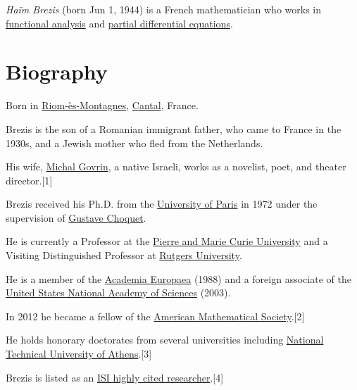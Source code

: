 \documentclass{book}
\numberwithin{equation}{section}
\begin{document}
\textit{Haïm Brezis} (born Jun 1, 1944) is a French mathematician who works in \href{https://en.wikipedia.org/wiki/Functional_analysis}{functional analysis} and \href{https://en.wikipedia.org/wiki/Partial_differential_equation}{partial differential equations}.

\section{Biography}
Born in \href{https://en.wikipedia.org/wiki/Riom-%C3%A8s-Montagnes}{Riom-ès-Montagnes}, \href{https://en.wikipedia.org/wiki/Cantal}{Cantal}, France.
    
Brezis is the son of a Romanian immigrant father, who came to France in the 1930s, and a Jewish mother who fled from the Netherlands.

His wife, \href{https://en.wikipedia.org/wiki/Michal_Govrin}{Michal Govrin}, a native Israeli, works as a novelist, poet, and theater director.[1]

Brezis received his Ph.D. from the \href{https://en.wikipedia.org/wiki/University_of_Paris}{University of Paris} in 1972 under the supervision of \href{https://en.wikipedia.org/wiki/Gustave_Choquet}{Gustave Choquet}.

He is currently a Professor at the \href{https://en.wikipedia.org/wiki/Pierre_and_Marie_Curie_University}{Pierre and Marie Curie University} and a Visiting Distinguished Professor at \href{https://en.wikipedia.org/wiki/Rutgers_University}{Rutgers University}.

He is a member of the \href{https://en.wikipedia.org/wiki/Academia_Europaea}{Academia Europaea} (1988) and a foreign associate of the \href{https://en.wikipedia.org/wiki/United_States_National_Academy_of_Sciences}{United States National Academy of Sciences} (2003).

In 2012 he became a fellow of the \href{https://en.wikipedia.org/wiki/American_Mathematical_Society}{American Mathematical Society}.[2]

He holds honorary doctorates from several universities including \href{https://en.wikipedia.org/wiki/National_Technical_University_of_Athens}{National Technical University of Athens}.[3]

Brezis is listed as an \href{https://en.wikipedia.org/wiki/ISI_highly_cited_researcher}{ISI highly cited researcher}.[4]
\end{document}
